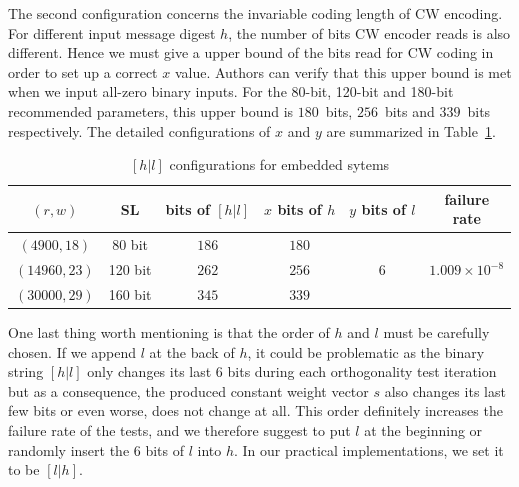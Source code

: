 \documentclass[10pt,journal,compsoc]{IEEEtran}
\begin{document}
The second configuration concerns the invariable coding length of CW encoding. For different input message digest $h$, the number of bits CW encoder reads is also different. Hence we must give a upper bound of the bits read for CW coding in order to set up a correct $x$ value. Authors can verify that this upper bound is met when we input all-zero binary inputs. For the 80-bit, 120-bit and 180-bit recommended parameters, this upper bound is $180$~bits, $256$~bits and $339$~bits respectively. The detailed configurations of $x$ and $y$ are summarized in Table~\ref{table:hlconfig}.

\begin{table}[!t]\centering
\caption{$[h|l]$ configurations for embedded sytems}
\label{table:hlconfig}
\begin{minipage}{.5\textwidth}\centering
\begin{tabular}{cccccc}
\hline
$(r, w)$ &  SL & \tabincell{c}{bits of\\ $[h|l]$} & \tabincell{c}{$x$ bits\\ of $h$}  & \tabincell{c}{$y$ bits\\ of $l$} & \tabincell{c}{failure\\ rate}  \\
\hline
$(4900,18)$ & 80 bit  &  $186$  &   $180$    & \multirow{3}{*}{$6$}&  \multirow{3}{*}{$1.009\times 10^{-8}$}\\
$(14960,23)$ & 120 bit   & $262$   &  $256$    &   &\\
$(30000,29)$ & 160 bit   &  $345$  & $339$        &   &\\
\hline
\end{tabular}
\end{minipage}
\end{table}

One last thing worth mentioning is that the order of $h$ and $l$ must be carefully chosen. If we append
$l$ at the back of $h$, it could be problematic as the binary string $[h|l]$ only changes its last $6$ bits during
each orthogonality test iteration but as a consequence, the produced constant weight vector $s$ also changes its last few bits or
even worse, does not change at all. This order definitely increases the failure rate of the tests, and we therefore suggest to put $l$ at the beginning or randomly insert the 6 bits of $l$ into $h$. In our practical implementations, we set it to be $[l|h]$.
\end{document}
